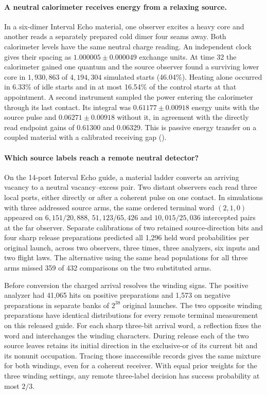 \documentclass[11pt]{article}
\begin{document}
\paragraph{A neutral calorimeter receives energy from a relaxing source.}
In a six-dimer Interval Echo material, one observer excites a heavy core
and another reads a separately prepared cold dimer four seams away.
Both calorimeter levels have the same neutral charge reading. An
independent clock gives their spacing as $1.000005\pm0.000049$
exchange units. At time 32 the calorimeter gained one quantum and the
source observer found a surviving lower core in $1{,}930{,}863$ of
$4{,}194{,}304$ simulated starts (46.04\%). Heating alone occurred in
6.33\% of idle starts and in at most 16.54\% of the control starts at
that appointment. A second instrument sampled the power entering the
calorimeter through its last contact. Its integral was
$0.61177\pm0.00918$ energy units with the source pulse and
$0.06271\pm0.00918$ without it, in agreement with the directly read
endpoint gains of 0.61300 and 0.06329. This is passive energy transfer
on a coupled material with a calibrated receiving gap
().

\paragraph{Which source labels reach a remote neutral detector?}
On the 14-port Interval Echo guide, a material ladder converts an arriving
vacancy to a neutral vacancy--excess pair. Two distant observers each read
three local ports, either directly or after a coherent pulse on one contact.
In simulations with three addressed source arms, the same ordered terminal
word $(2,1,0)$ appeared on $6{,}151/20{,}888$, $51{,}123/65{,}426$ and
$10{,}015/25{,}036$ intercepted pairs at the far observer. Separate
calibrations of two retained source-direction bits and four sharp release
preparations predicted all 1,296 held word probabilities per original
launch, across two observers, three times, three analyzers, six inputs and
two flight laws. The alternative using the same head populations for all
three arms missed 359 of 432 comparisons on the two substituted arms.

Before conversion the charged arrival resolves the winding signs. The
positive analyzer had 41,065 hits on positive preparations and 1,573
on negative preparations in separate banks of $2^{38}$ original launches.
The two opposite winding preparations have identical distributions for
every remote terminal measurement on this released guide. For each sharp
three-bit arrival word, a reflection fixes the word and interchanges the
winding characters. During release each of the two source leaves retains
its initial direction in the exclusive-or of its current bit and its
nonunit occupation. Tracing those inaccessible records gives the same
mixture for both windings, even for a coherent receiver. With equal prior
weights for the three winding settings, any remote three-label
decision has success probability at most $2/3$.
\end{document}
